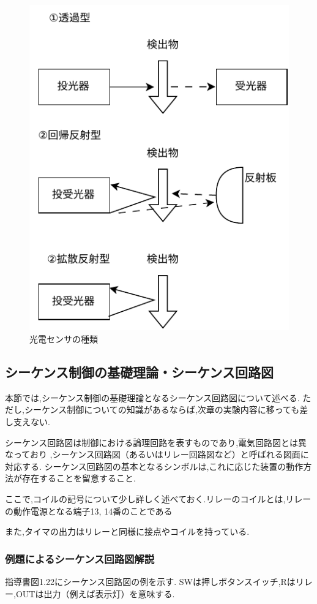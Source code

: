 \begin{figure}[h]
  \centering
  \includegraphics[scale=0.7]{sozai/13.pdf}
  \caption{光電センサの種類}
\end{figure}

\subsection{シーケンス制御の基礎理論・シーケンス回路図}

本節では,シーケンス制御の基礎理論となるシーケンス回路図について述べる.
ただし,シーケンス制御についての知識があるならば,次章の実験内容に移っても差し支えない.

シーケンス回路図は制御における論理回路を表すものであり,電気回路図とは異なっており
,シーケンス回路図（あるいはリレー回路図など）と呼ばれる図面に対応する.
シーケンス回路図の基本となるシンボルは,これに応じた装置の動作方法が存在することを留意すること.

ここで,コイルの記号について少し詳しく述べておく.リレーのコイルとは,リレーの動作電源となる端子13, 14番のことである

また,タイマの出力はリレーと同様に接点やコイルを持っている.

\subsubsection{例題によるシーケンス回路図解説}
指導書図1.22にシーケンス回路図の例を示す.
SWは押しボタンスイッチ,Rはリレー,OUTは出力（例えば表示灯）を意味する.

